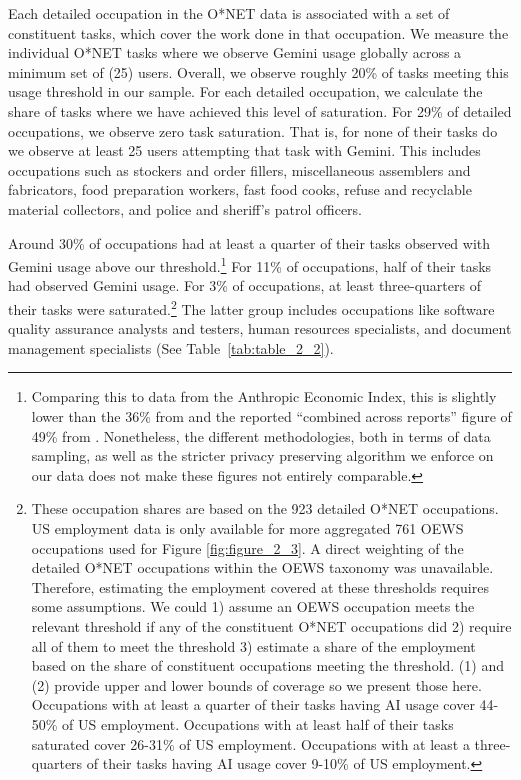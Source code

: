 \documentclass[11pt,a4paper]{article}
\begin{document}
Each detailed occupation in the O*NET data is associated with a set of constituent tasks, which cover the work done in that occupation. We measure the individual O*NET tasks where we observe Gemini usage globally across a minimum set of (25) users. Overall, we observe roughly 20\% of tasks meeting this usage threshold in our sample. For each detailed occupation, we calculate the share of tasks where we have achieved this level of saturation. For 29\% of detailed occupations, we observe zero task saturation. That is, for none of their tasks do we observe at least 25 users attempting that task with Gemini. This includes occupations such as stockers and order fillers, miscellaneous assemblers and fabricators, food preparation workers, fast food cooks, refuse and recyclable material collectors, and police and sheriff's patrol officers.

Around 30\% of occupations had at least a quarter of their tasks observed with Gemini usage above our threshold.\footnote{Comparing this to data from the Anthropic Economic Index, this is slightly lower than the 36\% from \cite{handa2025economictasksperformedai} and the reported ``combined across reports'' figure of 49\% from \cite{anthropic2026aeiv4}. Nonetheless, the different methodologies, both in terms of data sampling, as well as the stricter privacy preserving algorithm we enforce on our data does not make these figures not entirely comparable.} For 11\% of occupations, half of their tasks had observed Gemini usage. For 3\% of occupations, at least three-quarters of their tasks were saturated.\footnote{These occupation shares are based on the 923 detailed O*NET occupations. US employment data is only available for more aggregated 761 OEWS occupations used for Figure \ref{fig:figure_2_3}. A direct weighting of the detailed O*NET occupations within the OEWS taxonomy was unavailable. Therefore, estimating the employment covered at these thresholds requires some assumptions. We could 1) assume an OEWS occupation meets the relevant threshold if any of the constituent O*NET occupations did 2) require all of them to meet the threshold 3) estimate a share of the employment based on the share of constituent occupations meeting the threshold. (1) and (2) provide upper and lower bounds of coverage so we present those here. Occupations with at least a quarter of their tasks having AI usage cover 44-50\% of US employment. Occupations with at least half of their tasks saturated cover 26-31\% of US employment. Occupations with at least a three-quarters of their tasks having AI usage cover 9-10\% of US employment.} The latter group includes occupations like software quality assurance analysts and testers, human resources specialists, and document management specialists (See Table~\ref{tab:table_2_2}).
\end{document}
